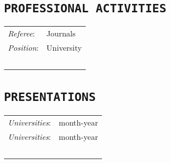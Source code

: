 \documentclass{cls/Curriculum_Vitae_Class}
\begin{document}

\section{\texttt{PROFESSIONAL ACTIVITIES}}
\begin{tabular}{ l l }
 \textit{Referee}: & Journals \\ [0.5em]
 \textit{Position}: & University \\~\\
\end{tabular}


\section{\texttt{PRESENTATIONS}}
\begin{tabular}{ l l }
 \textit{Universities}: &  \hfill month-year \\ [0.5em]
 \textit{Universities}: & \hfill month-year \\~\\
\end{tabular}
\end{document}
